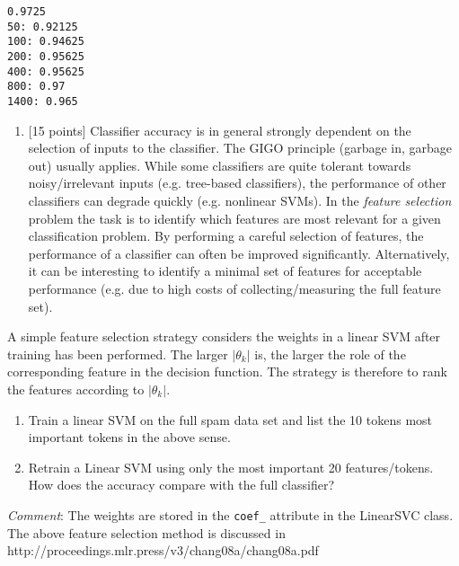 \documentclass[11pt]{article}
\providecommand{\tightlist}{%
      \setlength{\itemsep}{0pt}\setlength{\parskip}{0pt}}
\begin{document}
    \begin{Verbatim}[commandchars=\\\{\}]
0.9725
50: 0.92125
100: 0.94625
200: 0.95625
400: 0.95625
800: 0.97
1400: 0.965

    \end{Verbatim}

    \begin{enumerate}
\def\labelenumi{\alph{enumi})}
\setcounter{enumi}{1}
\tightlist
\item
  {[}15 points{]} Classifier accuracy is in general strongly dependent
  on the selection of inputs to the classifier. The GIGO principle
  (garbage in, garbage out) usually applies. While some classifiers are
  quite tolerant towards noisy/irrelevant inputs (e.g. tree-based
  classifiers), the performance of other classifiers can degrade quickly
  (e.g. nonlinear SVMs). In the \emph{feature selection} problem the
  task is to identify which features are most relevant for a given
  classification problem. By performing a careful selection of features,
  the performance of a classifier can often be improved significantly.
  Alternatively, it can be interesting to identify a minimal set of
  features for acceptable performance (e.g. due to high costs of
  collecting/measuring the full feature set).
\end{enumerate}

A simple feature selection strategy considers the weights in a linear
SVM after training has been performed. The larger \(|\theta_k|\) is, the
larger the role of the corresponding feature in the decision function.
The strategy is therefore to rank the features according to
\(|\theta_k|\).

\begin{enumerate}
\def\labelenumi{\roman{enumi})}
\item
  Train a linear SVM on the full spam data set and list the 10 tokens
  most important tokens in the above sense.
\item
  Retrain a Linear SVM using only the most important 20 features/tokens.
  How does the accuracy compare with the full classifier?
\end{enumerate}

\emph{Comment}: The weights are stored in the \texttt{coef\_} attribute
in the LinearSVC class. The above feature selection method is discussed
in http://proceedings.mlr.press/v3/chang08a/chang08a.pdf
\end{document}

